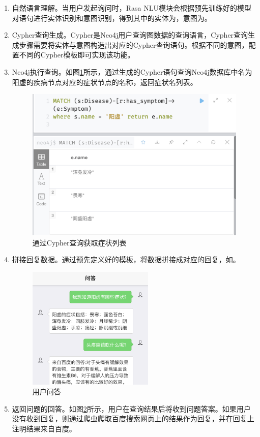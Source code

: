 \begin{enumerate}
    \item 自然语言理解。当用户发起询问时，Rasa NLU模块会根据预先训练好的模型对语句进行实体识别和意图识别，得到其中的实体为，意图为。

    \item Cypher查询生成。Cypher是Neo4j用户查询图数据的查询语言，Cypher查询生成步骤需要将实体与意图构造出对应的Cypher查询语句。根据不同的意图，配置不同的Cypher模板即可实现该功能。

    \item Neo4j执行查询。如图\ref{fig:cypher}所示，通过生成的Cypher语句查询Neo4j数据库中名为阳虚的疾病节点对应的症状节点的名称，返回症状名列表。

    \begin{figure}[h]
        \centering
        \includegraphics[width=12cm]{images/query.png}
        \caption{通过Cypher查询获取症状列表}
        \label{fig:cypher}
    \end{figure}

    \item 拼接回复数据。通过预先定义好的模板，将数据拼接成对应的回复，如。

    \begin{figure}[h]
        \centering
        \includegraphics[width=6cm]{images/qa2.png}
        \caption{用户问答}
        \label{fig:qa}
    \end{figure}

    \item 返回问题的回答。如图\ref{fig:qa}所示，用户在查询结果后将收到问题答案。如果用户没有收到回复，则通过爬虫爬取百度搜索网页上的结果作为回复，并在回复上注明结果来自百度。

\end{enumerate}



